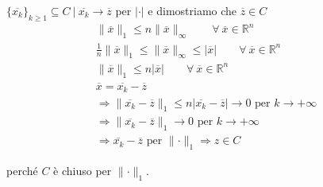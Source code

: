 \begin{exbar}
\begin{example}
\begin{itemize}
		$\{ \overline{x_k}\}_{k \geq 1} \subseteq C \ \big| \ \overline{x_k} \rightarrow \overline{z}$ per $|\cdot|$ e dimostriamo che $\overline{z} \in C$ 
		\begin{gather*}
			\parallel \overline{x} \parallel_1 \leq n \parallel \overline{x} \parallel_\infty \qquad \forall \ \overline{x} \in \mathbb{R}^n
			\\
			\frac{1}{n} \parallel \overline{x} \parallel_1 \leq \parallel \overline{x}\parallel_\infty \leq |\overline{x}| \qquad \forall \ \overline{x} \in \mathbb{R}^n
			\\
			\parallel \overline{x} \parallel_1 \leq n |\overline{x}| \qquad \forall \ \overline{x} \in \mathbb{R}^n
			\\
			\overline{x} = \overline{x_k} - \overline{z}
			\\
			\Rightarrow \parallel \overline{x_k} - \overline{z} \parallel_1 \leq n |\overline{x_k} - \overline{z}| \rightarrow 0 \text{ per } k \rightarrow +\infty
			\\
			\Rightarrow \parallel \overline{x_k} - \overline{z} \parallel_1 \rightarrow 0 \text{ per } k \rightarrow +\infty
			\\
			\Rightarrow \overline{x_k} - \overline{z} \text{ per } \parallel \cdot \parallel_1 \Rightarrow z \in C
		\end{gather*}
		
		perché $C$ è chiuso per $\parallel \cdot \parallel_1$.
	\end{itemize}
\end{example}
\end{exbar}




